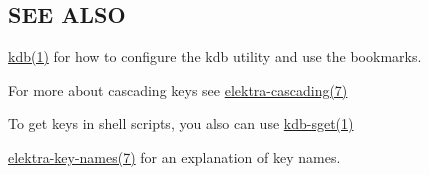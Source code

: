 \subsection*{S\+EE A\+L\+SO}


\begin{DoxyItemize}
\item \hyperlink{doc_help_kdb_md}{kdb(1)} for how to configure the kdb utility and use the bookmarks.
\item For more about cascading keys see \hyperlink{doc_help_elektra-cascading_md}{elektra-\/cascading(7)}
\item To get keys in shell scripts, you also can use \hyperlink{doc_help_kdb-sget_md}{kdb-\/sget(1)}
\item \hyperlink{doc_help_elektra-key-names_md}{elektra-\/key-\/names(7)} for an explanation of key names. 
\end{DoxyItemize}